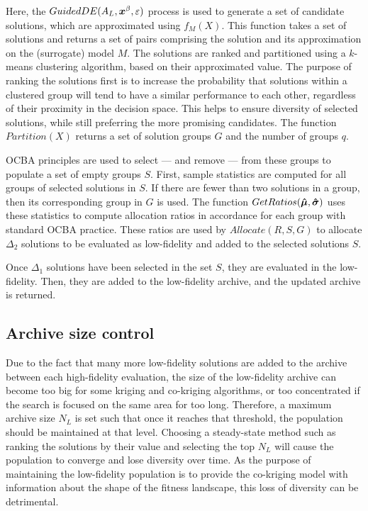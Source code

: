 Here, the $GuidedDE(A_L,\boldsymbol{x}^\beta,\varepsilon)$ process is used to generate a set of candidate solutions, which are approximated using $f_M(X)$. This function takes a set of solutions and returns a set of pairs comprising the solution and its approximation on the (surrogate) model $M$. The solutions are ranked and partitioned using a $k$-means clustering algorithm, based on their approximated value. The purpose of ranking the solutions first is to increase the probability that solutions within a clustered group will tend to have a similar performance to each other, regardless of their proximity in the decision space. This helps to ensure diversity of selected solutions, while still preferring the more promising candidates. The function $Partition(X)$ returns a set of solution groups $G$ and the number of groups $q$.

OCBA principles are used to select --- and remove --- from these groups to populate a set of empty groups $S$. First, sample statistics are computed for all groups of selected solutions in $S$. If there are fewer than two solutions in a group, then its corresponding group in $G$ is used. The function $GetRatios(\boldsymbol{\hat{\mu}},\boldsymbol{\hat{\sigma}})$ uses these statistics to compute allocation ratios in accordance for each group with standard OCBA practice. These ratios are used by $Allocate(R,S,G)$ to allocate $\Delta_2$ solutions to be evaluated as low-fidelity and added to the selected solutions $S$.

Once $\Delta_1$ solutions have been selected in the set $S$, they are evaluated in the low-fidelity. Then, they are added to the low-fidelity archive, and the updated archive is returned.

\subsection{Archive size control}
Due to the fact that many more low-fidelity solutions are added to the archive between each high-fidelity evaluation, the size of the low-fidelity archive can become too big for some kriging and co-kriging algorithms, or too concentrated if the search is focused on the same area for too long. Therefore, a maximum archive size $N_L$ is set such that once it reaches that threshold, the population should be maintained at that level. Choosing a steady-state method such as ranking the solutions by their value and selecting the top $N_L$ will cause the population to converge and lose diversity over time. As the purpose of maintaining the low-fidelity population is to provide the co-kriging model with information about the shape of the fitness landscape, this loss of diversity can be detrimental. 


